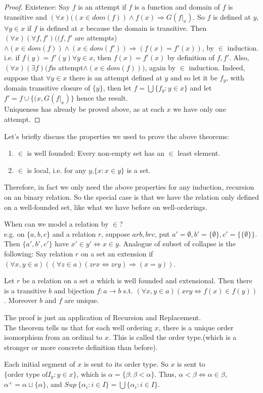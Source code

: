 \begin{proof} Existence: Say $f$ is an attempt if $f$ is a function and domain of $f$ is transitive and $(\forall x)((x \in dom(f)) \wedge f(x) \Rightarrow G(f|_x)$. So $f$ is defined at $y$, $\forall y \in x$ if $f$ is defined at $x$ because the domain is transitive. Then $(\forall x)(\forall f,f')((f,f'$ are attempts) $\wedge (x \in dom(f)) \wedge (x \in dom(f')) \Rightarrow (f(x) =f'(x))$, by $\in$ induction. i.e. if $f(y)=f'(y) \forall y \in x$, then $f(x)=f'(x)$ by definition of $f,f'$. Also, $(\forall x)(\exists f)(f $is attempt$ \wedge (x \in dom(f)))$, again by $\in$ induction. Indeed, suppose that $\forall y \in x$ there is an attempt defined at $y$ and so let it be $f_y$, with domain transitive closure of $\{y\}$, then let $f=\bigcup \{f_y: y \in x\}$ and let $f'=f \cup \{(x,G(f|_x)\}$ hence the result.\\
Uniqueness has already be proved above, as at each $x$ we have only one attempt.
\end{proof}
\begin{remark} Let's briefly discuss the properties we used to prove the above theorems:
\begin{enumerate}
\item $\in$ is well founded: Every non-empty set has an $\in$ least element.\\
\item $\in$ is local, i.e. for any $y$,$\{x: x \in y\}$ is a set.
\end{enumerate}
Therefore, in fact we only need the above properties for any induction, recursion on an binary relation. So the special case is that we have the relation only defined on a well-founded set, like what we have before on well-orderings.
\end{remark}
When can we model a relation by $\in$?\\
e.g. on $\{a,b,c\}$ and a relation $r$, suppose $a r b, b r c$, put $a'=\emptyset, b'=\{\emptyset\}, c'=\{\{\emptyset\}\}$. Then $\{a',b',c'\}$ have $x' \in y' \iff x \in y$. Analogue of subset of collapse is the following: Say relation $r$ on a set an extension if $(\forall x,y \in a)((\forall z \in a)(z r x \iff z r y) \Rightarrow (x=y))$.
\begin{theorem} Let $r$ be a relation on a set $a$ which is well founded and extensional. Then there is a transitive $b$ and bijection $f: a \rightarrow b$ s.t. $(\forall x,y \in a)(x r y \iff f(x) \in f(y))$. Moreover $b$ and $f$ are unique.
\end{theorem}
The proof is just an application of Recursion and Replacement.\\
The theorem tells us that for each well ordering $x$, there is a unique order isomorphism from an ordinal to $x$. This is called the order type.(which is a stronger or more concrete definition than before).
\begin{remark} Each initial segment of $x$ is sent to its order type. So $x$ is sent to $\{\text{order type of} I_y: y \in x\}$, which is $\alpha=\{\beta: \beta < \alpha\}$. Thus, $\alpha < \beta \iff \alpha \in \beta$, $\alpha^+ = \alpha \sqcup \{\alpha\}$, and $Sup~\{\alpha_i: i \in I\}=\bigcup \{\alpha_i: i \in I\}$.
\end{remark}
